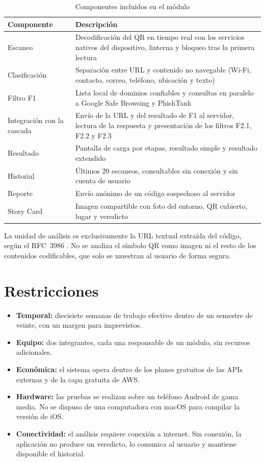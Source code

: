 \begin{table}[H]
	\centering
	\caption{Componentes incluidos en el módulo}
	\label{tab:delimitacion}
	\begin{tabular}{@{}>{\raggedright\arraybackslash}p{4.2cm}>{\raggedright\arraybackslash}p{8.8cm}@{}}
		\toprule
		\textbf{Componente} & \textbf{Descripción} \\
		\midrule
		Escaneo & Decodificación del QR en tiempo real con los servicios nativos del dispositivo, linterna y bloqueo tras la primera lectura \\
		Clasificación & Separación entre URL y contenido no navegable (Wi-Fi, contacto, correo, teléfono, ubicación y texto) \\
		Filtro F1 & Lista local de dominios confiables y consultas en paralelo a Google Safe Browsing y PhishTank \\
		Integración con la cascada & Envío de la URL y del resultado de F1 al servidor, lectura de la respuesta y presentación de los filtros F2.1, F2.2 y F2.3 \\
		Resultado & Pantalla de carga por etapas, resultado simple y resultado extendido \\
		Historial & Últimos 20 escaneos, consultables sin conexión y sin cuenta de usuario \\
		Reporte & Envío anónimo de un código sospechoso al servidor \\
		Story Card & Imagen compartible con foto del entorno, QR cubierto, lugar y veredicto \\
		\bottomrule
	\end{tabular}
\end{table}

La unidad de análisis es exclusivamente la URL textual extraída del código, según el RFC~3986 \cite{rfc3986}. No se analiza el símbolo QR como imagen ni el resto de los contenidos codificables, que solo se muestran al usuario de forma segura.

\section{Restricciones}

\begin{itemize}
	\item \textbf{Temporal:} diecisiete semanas de trabajo efectivo dentro de un semestre de veinte, con un margen para imprevistos.
	\item \textbf{Equipo:} dos integrantes, cada una responsable de un módulo, sin recursos adicionales.
	\item \textbf{Económica:} el sistema opera dentro de los planes gratuitos de las APIs externas y de la capa gratuita de AWS.
	\item \textbf{Hardware:} las pruebas se realizan sobre un teléfono Android de gama media. No se dispuso de una computadora con macOS para compilar la versión de iOS.
	\item \textbf{Conectividad:} el análisis requiere conexión a internet. Sin conexión, la aplicación no produce un veredicto, lo comunica al usuario y mantiene disponible el historial.
\end{itemize}

